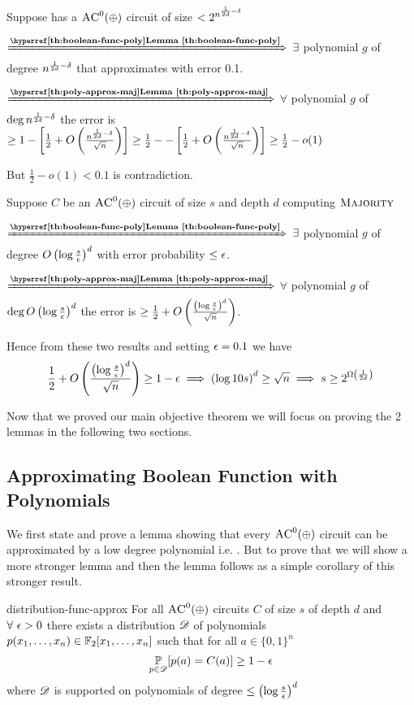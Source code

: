 \begin{proof-of-theorem}[razborovsmolensky]
	Suppose  has a $\textsc{AC}^0(\oplus)$ circuit of size $<2^{n^{\frac1{2d}-\delta}}$\parinf
	
	$\xRightarrow{\textbf{\lmref{boolean-func-poly}}}$ $\exists$ polynomial $g$ of degree $n^{\frac1{2d}-\delta}$ that approximates  with error 0.1.
	
	
	$\xRightarrow{\textbf{\lmref{poly-approx-maj}}}$ $\forall$ polynomial $g$ of $\deg n^{\frac1{2d}-\delta}$ the error is $\geq 1-\left[\frac12+O\left( \frac{n^{\frac1{2d}-\delta}}{\sqrt{n}} \right)\right]\geq \frac12--\left[\frac12+O\left( \frac{n^{\frac1{2d}-\delta}}{\sqrt{n}} \right)\right]\geq  \frac12-o(1)$
	\parinn
	
	But $\frac12-o(1)<0.1$ is contradiction.
\end{proof-of-theorem}
\begin{alternate-proof}[razborovsmolensky]
	Suppose $C$ be an $\textsc{AC}^0(\oplus)$ circuit of size $s$ and depth $d$ computing $\textsc{Majority}$\parinf
	
	$\xRightarrow{\textbf{\lmref{boolean-func-poly}}}$ $\exists$ polynomial $g$ of degree $O\left(\log \frac{s}{\epsilon}\right)^d$ with error probability $\leq \epsilon$.
	
	$\xRightarrow{\textbf{\lmref{poly-approx-maj}}}$ $\forall$ polynomial $g$ of $\deg O\left(\log \frac{s}{\epsilon}\right)^d$ the error is $\geq \frac12+O\left(\frac{\left(\log \frac{s}{\epsilon}\right)^d}{\sqrt{n}}  \right)$.\parinn
	
	Hence from these two results and setting $\epsilon=0.1$ we have $$\frac12+O\left(\frac{\left(\log \frac{s}{\epsilon}\right)^d}{\sqrt{n}}  \right)\geq 1-\epsilon\implies \left(\log 10s\right)^d\geq \sqrt{n}\implies s\geq 2^{\Omega\left(\frac{1}{2d}\right)}$$
\end{alternate-proof}

Now that we proved our main objective theorem we will focus on proving the 2 lemmas in the following two sections.
\subsection{Approximating Boolean Function with Polynomials}
We first state and prove a lemma showing that every $\textsc{AC}^0(\oplus)$ circuit can be approximated by a low degree polynomial i.e. .  But to prove that we will show a more stronger lemma and then the lemma follows as a simple corollary of this stronger result.
\begin{lemma}{}{distribution-func-approx}
	For all $\textsc{AC}^0(\oplus)$ circuits $C$ of size $s$ of depth $d$ and $\forall\ \epsilon>0$ there exists a distribution ${\mathscr{D}}$ of polynomials $p(x_1,\dots, x_n)\in\mathbb{F}_2[x_1,\dots, x_n]$  such that for all $a\in\{0,1\}^n$ $$\underset{p\in{\mathscr{D}}}{\mathbb{P}}[p(a)=C(a)]\geq 1-\epsilon$$ where ${\mathscr{D}}$ is supported on polynomials of degree $\leq \left(\log \frac{s}{\epsilon}\right)^d$
\end{lemma}

